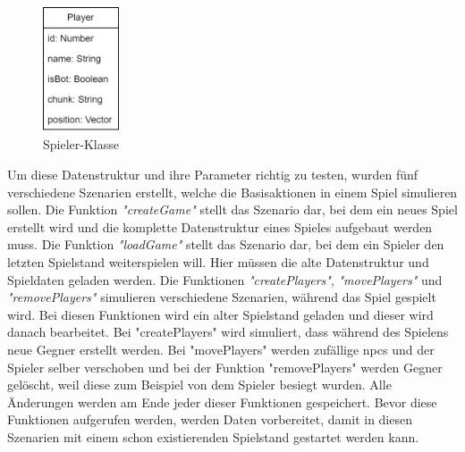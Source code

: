 \begin{figure}[htp]
    \centering
    \includegraphics[width=0.2\textwidth]{images/PlayerKlasse.png}
    \caption{Spieler-Klasse}
    \label{fig:playerClass}
\end{figure}

Um diese Datenstruktur und ihre Parameter richtig zu testen, wurden fünf verschiedene Szenarien erstellt, welche die Basisaktionen in einem Spiel simulieren sollen. Die Funktion \textit{"createGame"} stellt das Szenario dar, bei dem ein neues Spiel erstellt wird und die komplette Datenstruktur eines Spieles aufgebaut werden muss. Die Funktion \textit{"loadGame"} stellt das Szenario dar, bei dem ein Spieler den letzten Spielstand weiterspielen will. Hier müssen die alte Datenstruktur und Spieldaten geladen werden. Die Funktionen \textit{"createPlayers"}, \textit{"movePlayers"} und \textit{"removePlayers"} simulieren verschiedene Szenarien, während das Spiel gespielt wird. Bei diesen Funktionen wird ein alter Spielstand geladen und dieser wird danach bearbeitet. Bei "createPlayers" wird simuliert, dass während des Spielens neue Gegner erstellt werden. Bei "movePlayers" werden zufällige \acp{npc} und der Spieler selber verschoben und bei der Funktion "removePlayers" werden Gegner gelöscht, weil diese zum Beispiel von dem Spieler besiegt wurden. Alle Änderungen werden am Ende jeder dieser Funktionen gespeichert. Bevor diese Funktionen aufgerufen werden, werden Daten vorbereitet, damit in diesen Szenarien mit einem schon existierenden Spielstand gestartet werden kann.

